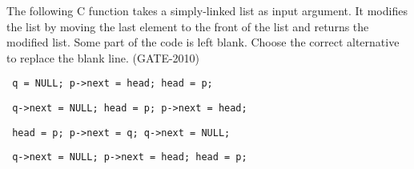 \begin{questyle}
  \question  The following C function takes a simply-linked list as input argument. It modifies the list by
            moving the last element to the front of the list and returns the modified list. Some part of
            the code is left blank. Choose the correct alternative to replace the blank line. (GATE-2010)
            
  \begin{choices}
    \choice         \begin{verbatim} q = NULL; p->next = head; head = p; \end{verbatim}
    \choice         \begin{verbatim} q->next = NULL; head = p; p->next = head; \end{verbatim}
    \choice         \begin{verbatim} head = p; p->next = q; q->next = NULL;  \end{verbatim}
    \CorrectChoice  \begin{verbatim} q->next = NULL; p->next = head; head = p;  \end{verbatim}
  \end{choices}
\end{questyle}


